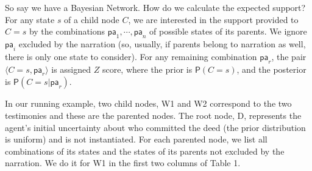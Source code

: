\documentclass[10pt,]{scrartcl}
\newcommand{\ra}{\rangle}
\newcommand{\la}{\langle}
\newcommand{\pr}{\mathsf{P}}
\newcommand{\s}[1]{\mbox{\textsf{#1}}}
\begin{document}
So say we have a Bayesian Network. How do we calculate the expected support? For any state \(s\) of
a child node \(C\), we are interested in the
support provided to \(C=s\) by the combinations
\(\mathsf{pa}_1, \cdots, \mathsf{pa}_n\) of possible states of its
parents. We ignore \(\mathsf{pa}_i\) excluded by the narration (so, usually, if parents belong to narration as well, there is only one state to consider). For any
remaining combination \(\mathsf{pa}_r\), the pair
\(\la C=s, \mathsf{pa}_r\ra\) is assigned  $Z$ score, where the prior is $\pr(C=s)$, and the posterior is $\pr(C=s \vert \mathsf{pa}_r)$.

In our running example, two child nodes, \textsf{W1} and
\textsf{W2} correspond to the two testimonies and these are the parented  nodes.
 The root node, \textsf{D},
 represents the agent's initial uncertainty about who
committed the deed (the prior distribution is uniform) and is not
instantiated. 
For each parented node,  we list all combinations  of its states and the states of its parents not excluded by the narration. We do it for \textsf{W1} in the first two columns of Table 1.


\begin{table}
\begin{table}[H]
\centering
{}
\end{table}
\caption{ECS calculation table for \s{W1} in the first scenario in the \s{Witness} problem.}
\label{t:w1}
\end{table}
\end{document}
